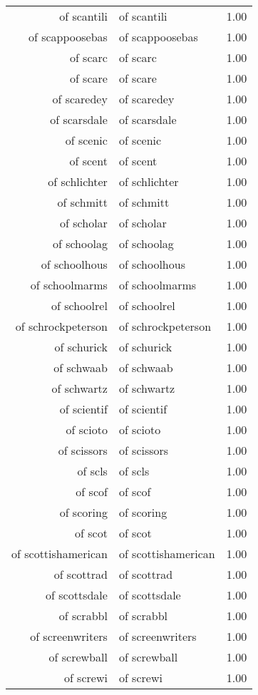 \begin{table}[ht]
\begin{tabular}{rlr}
  of scantili & of scantili & 1.00 \\ 
  of scappoosebas & of scappoosebas & 1.00 \\ 
  of scarc & of scarc & 1.00 \\ 
  of scare & of scare & 1.00 \\ 
  of scaredey & of scaredey & 1.00 \\ 
  of scarsdale & of scarsdale & 1.00 \\ 
  of scenic & of scenic & 1.00 \\ 
  of scent & of scent & 1.00 \\ 
  of schlichter & of schlichter & 1.00 \\ 
  of schmitt & of schmitt & 1.00 \\ 
  of scholar & of scholar & 1.00 \\ 
  of schoolag & of schoolag & 1.00 \\ 
  of schoolhous & of schoolhous & 1.00 \\ 
  of schoolmarms & of schoolmarms & 1.00 \\ 
  of schoolrel & of schoolrel & 1.00 \\ 
  of schrockpeterson & of schrockpeterson & 1.00 \\ 
  of schurick & of schurick & 1.00 \\ 
  of schwaab & of schwaab & 1.00 \\ 
  of schwartz & of schwartz & 1.00 \\ 
  of scientif & of scientif & 1.00 \\ 
  of scioto & of scioto & 1.00 \\ 
  of scissors & of scissors & 1.00 \\ 
  of scls & of scls & 1.00 \\ 
  of scof & of scof & 1.00 \\ 
  of scoring & of scoring & 1.00 \\ 
  of scot & of scot & 1.00 \\ 
  of scottishamerican & of scottishamerican & 1.00 \\ 
  of scottrad & of scottrad & 1.00 \\ 
  of scottsdale & of scottsdale & 1.00 \\ 
  of scrabbl & of scrabbl & 1.00 \\ 
  of screenwriters & of screenwriters & 1.00 \\ 
  of screwball & of screwball & 1.00 \\ 
  of screwi & of screwi & 1.00 \\ 

\end{tabular}
\end{table}

